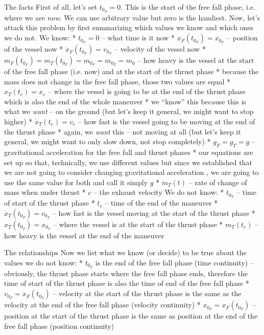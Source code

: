 \sec The facts
First of all, let's set $t_{0_F} = 0$.
This is the start of the free fall phase, i.e. where we are {\em now}.
We can use arbitrary value but zero is the handiest.
Now, let's attack this problem by first summarizing which values we know and which ones we do not.
We know:
\begitems
    * $t_{0_F} = 0$ -- what time is it now
    * $x_F(t_{0_F}) = x_{0_F}$ -- position of the vessel now
    * $\dot{x}_F(t_{0_F}) = v_{0_F}$ -- velocity of the vessel now
    * $m_F(t_{0_F}) = m_T(t_{0_T}) = m_{0_F} = m_{0_T} = m_0$ -- how heavy is the vessel at the start of the free fall phase (i.e. now) and at the start of the thrust phase
    \begitems
        * because the mass does not change in the free fall phase, those two values are equal
    \enditems
    * $x_T(t_e) = x_e$ -- where the vessel is going to be at the end of the thrust phase which is also the end of the whole maneuver
    \begitems
        * we ``know'' this because this is what we {\em want} -- on the ground (but let's keep it general, we might want to stop higher)
    \enditems
    * $\dot{x}_T(t_e) = v_e$ -- how fast is the vessel going to be moving at the end of the thrust phase
    \begitems
        * again, we {\em want} this -- not moving at all (but let's keep it general, we might want to only slow down, not stop completely)
    \enditems
    * $g_F = g_T = g$ -- gravitational acceleration for the free fall and thrust phases
    \begitems
        * our equations are set up so that, technically, we use different values but since we established that we are not going to consider changing gravitational acceleration
          , we are going to use the same value for both and call it simply $g$
    \enditems
    * $\dot{m}_T(t)$ -- rate of change of mass when under thrust
    * $c$ -- the exhaust velocity
\enditems
We do not know:
\begitems
    * $t_{0_T}$ -- time of start of the thrust phase
    * $t_e$ -- time of the end of the maneuver
    * $\dot{x}_T(t_{0_T}) = v_{0_T}$ -- how fast is the vessel moving at the start of the thrust phase
    * $x_T(t_{0_T}) = x_{0_T}$ -- where the vessel is at the start of the thrust phase
    * $m_T(t_e)$ -- how heavy is the vessel at the end of the maneuver
\enditems

\sec The relationships
Now we list what we know (or decide) to be true about the values we do not know:
\begitems
    * $t_{0_T}$ is the end of the free fall phase (time continuity) -- obviously, the thrust phase starts where the free fall phase ends, therefore the time of start of the thrust phase is also the time of end of the free fall phase
    * $v_{0_T} = \dot{x}_F(t_{0_T})$ -- velocity at the start of the thrust phase is the same as the velocity at the end of the free fall phase (velocity continuity)
    * $x_{0_T} = x_F(t_{0_T})$ -- position at the start of the thrust phase is the same as position at the end of the free fall phase (position continuity)
\enditems

